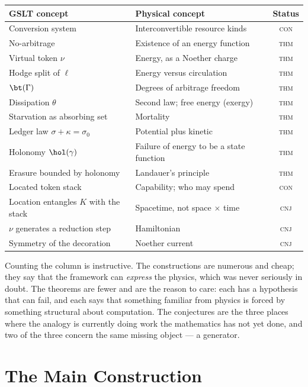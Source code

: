 \begin{center}
\renewcommand{\arraystretch}{1.3}
\begin{tabular}{p{4.9cm} p{5.6cm} c}
\toprule
\textbf{GSLT concept} & \textbf{Physical concept} & \textbf{Status} \\
\midrule
Conversion system & Interconvertible resource kinds & \textsc{con} \\
No-arbitrage & Existence of an energy function & \textsc{thm} \\
Virtual token $\nu$ & Energy, as a Noether charge & \textsc{thm} \\
Hodge split of $\ell$ & Energy versus circulation & \textsc{thm} \\
$\bt(\Gamma)$ & Degrees of arbitrage freedom & \textsc{thm} \\
Dissipation $\theta$ & Second law; free energy (exergy) & \textsc{thm} \\
Starvation as absorbing set & Mortality & \textsc{thm} \\
Ledger law $\sigma + \kappa = \sigma_0$ & Potential plus kinetic & \textsc{thm} \\
Holonomy $\hol(\gamma)$ & Failure of energy to be a state function & \textsc{thm} \\
Erasure bounded by holonomy & Landauer's principle & \textsc{thm} \\
Located token stack & Capability; who may spend & \textsc{con} \\
Location entangles $K$ with the stack & Spacetime, not space $\times$ time & \textsc{cnj} \\
$\nu$ generates a reduction step & Hamiltonian & \textsc{cnj} \\
Symmetry of the decoration & Noether current & \textsc{cnj} \\
\bottomrule
\end{tabular}
\end{center}

Counting the column is instructive.  The constructions are numerous and
cheap; they say that the framework can \emph{express} the physics, which
was never seriously in doubt.  The theorems are fewer and are the reason
to care: each has a hypothesis that can fail, and each says that
something familiar from physics is forced by something structural about
computation.  The conjectures are the three places where the analogy is
currently doing work the mathematics has not yet done, and two of the
three concern the same missing object --- a generator.

\section{The Main Construction}

